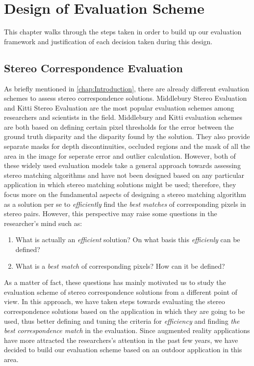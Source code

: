 \chapter{Design of Evaluation Scheme}

This chapter walks through the steps taken in order to build up our evaluation framework and justification of each decision taken during this design.

\section{Stereo Correspondence Evaluation}

As briefly mentioned in \ref{chap:Introduction}, there are already different evaluation schemes to assess stereo correspondence solutions. Middlebury Stereo Evaluation \cite{mideval} and 
Kitti Stereo Evaluation \cite{kitti} are the most popular evaluation schemes among researchers and scientists in the field. 
Middlebury and Kitti evaluation schemes are both based on defining certain pixel thresholds for the error between the ground truth disparity and the disparity found by the solution. 
They also provide separate masks for depth discontinuities, occluded regions and the mask of all the area in the image for seperate error and outlier calculation.
However, both of these widely used evaluation models take a general approach towards assessing stereo matching algorithms and have not been designed based on any particular application in which 
stereo matching solutions might be used; therefore, they focus more on the fundamental aspects of designing a stereo matching algorithm as a solution per se to \textit{efficiently}
find the \textit{best matches} of corresponding pixels in stereo pairs. 
However, this perspective may raise some questions in the researcher's mind such as:

\begin{enumerate}
\item What is actually an \textit{efficient} solution? On what basis this \textit{efficienly} can be defined?
\item What is a \textit{best match} of corresponding pixels? How can it be defined?
\end{enumerate}

As a matter of fact, these questions has mainly motivated us to study the evaluation scheme of stereo correspondence solutions from a different point of view. 
In this approach, we have taken steps towards evaluating the stereo correspondence solutions based on the application in which they are going to be used, 
thus better defining and tuning the criteria for \textit{efficiency} and 
finding \textit{the best correspondence match} in the evaluation. Since augmented reality applications have more attracted the researchers's attention in the past few years, 
we have decided to build our evaluation scheme based on an outdoor application in this area.

